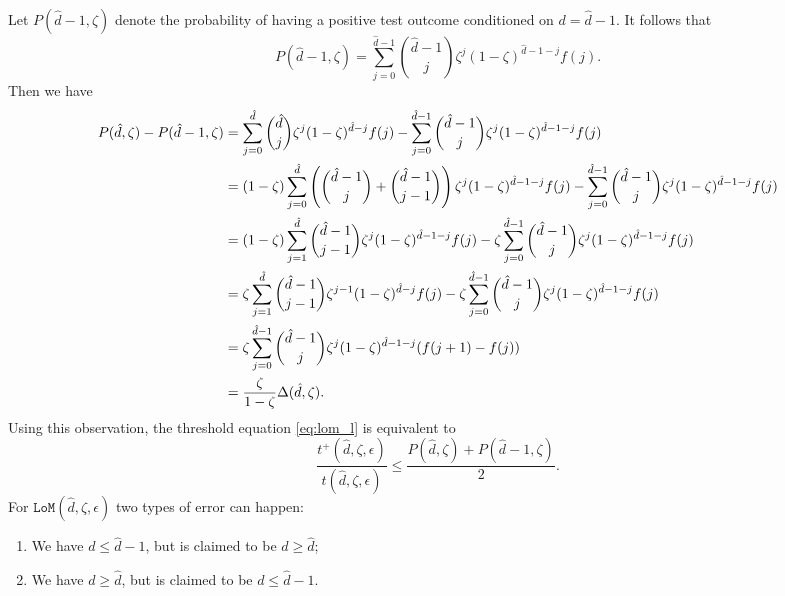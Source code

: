 \documentclass[onecolumn,letterpaper]{IEEEtran}
\newcommand{\lom}{{\texttt{LoM}}}
\newcommand{\lomerr}{{\epsilon}}
\newcommand{\ud}{{\hat{d}}}
\newcommand{\lomp}{{P}}
\newcommand{\lomcp}{{\zeta}}
\newcommand{\lomrs}{{t(\ud,\lomcp,\lomerr)}}
\newcommand{\lompo}{{t^{+}(\ud,\lomcp,\lomerr)}}
\newcommand{\lompp}{{\lomp(\ud,\lomcp)}}
\newcommand{\lomppo}{{\lomp(\ud-1,\lomcp)}}
\newcommand{\lompgap}{{\Delta(\ud,\lomcp)}}
\begin{document}
\begin{IEEEproof}
Let $\lomppo$ denote the probability of having a positive test outcome conditioned on $d=\ud-1$. It follows that
\begin{equation*} %
    \lomppo = \sum\limits_{j=0}^{\ud-1} \binom{\ud-1}{j} \lomcp^j (1-\lomcp)^{\ud-1-j} f(j).
\end{equation*}
Then we have
    \begin{align}
        \lompp - \lomppo &= \sum\limits_{j=0}^{\ud} \binom{\ud}{j} \lomcp^j (1-\lomcp)^{\ud-j} f(j) - \sum\limits_{j=0}^{\ud-1} \binom{\ud-1}{j} \lomcp^j (1-\lomcp)^{\ud-1-j} f(j) \notag\\
        &= (1-\lomcp) \sum\limits_{j=0}^{\ud} \left( \binom{\ud-1}{j} + \binom{\ud-1}{j-1} \right) \lomcp^j (1-\lomcp)^{\ud-1-j} f(j) - \sum\limits_{j=0}^{\ud-1} \binom{\ud-1}{j} \lomcp^j (1-\lomcp)^{\ud-1-j} f(j) \notag\\
        &= (1-\lomcp) \sum\limits_{j=1}^{\ud} \binom{\ud-1}{j-1} \lomcp^j (1-\lomcp)^{\ud-1-j} f(j) - \lomcp \sum\limits_{j=0}^{\ud-1} \binom{\ud-1}{j} \lomcp^j (1-\lomcp)^{\ud-1-j} f(j) \notag\\
        &= \lomcp \sum\limits_{j=1}^{\ud} \binom{\ud-1}{j-1} \lomcp^{j-1} (1-\lomcp)^{\ud-j} f(j) - \lomcp \sum\limits_{j=0}^{\ud-1} \binom{\ud-1}{j} \lomcp^j (1-\lomcp)^{\ud-1-j} f(j) \notag\\
        &= \lomcp \sum\limits_{j=0}^{\ud-1} \binom{\ud-1}{j} \lomcp^j (1-\lomcp)^{\ud-1-j} (f(j+1) - f(j)) \notag\\
        &= \frac{\lomcp}{1-\lomcp} \lompgap. \label{eq:lompgap_dif}
    \end{align}
    Using this observation, the threshold equation \eqref{eq:lom_l} is equivalent to
    \begin{equation}\label{eq:sub:threshold}
        \frac{\lompo}{\lomrs} \le \frac{\lompp + \lomppo}{2}.
    \end{equation}
    For $\lom(\ud,\lomcp,\lomerr)$ two types of error can happen:
    \begin{enumerate}[label=\roman*)]
    \item We have $d \le \ud-1$, but is claimed to be $d \ge \ud$;\label{sub:error:TypeI}
    \item We have $d \ge \ud$, but is claimed to be $d \le \ud-1$.\label{sub:error:TypeII}
    \end{enumerate}


\end{IEEEproof}
\end{document}
